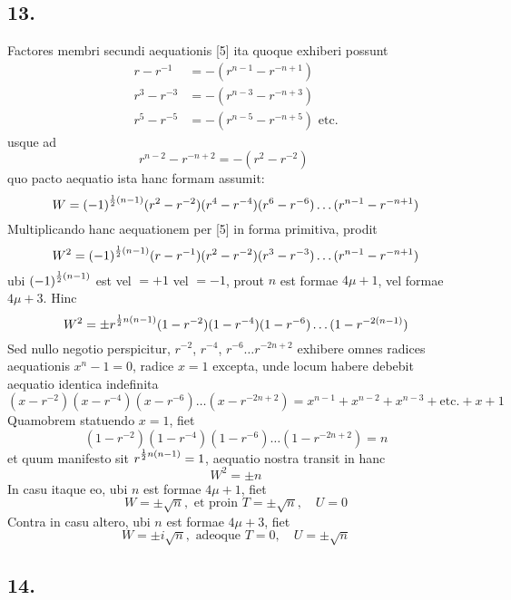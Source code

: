 \documentclass[twoside,12pt]{memoir}
\let\oldfrac\frac
\def\frac#1#2{\mathchoice{\tfrac{#1}{#2}}{\oldfrac{#1}{#2}}{\genfrac{}{}{}{2}{#1}{#2\mathstrut}}{\genfrac{}{}{}{3}{#1}{#2\mathstrut}}}
\begin{document}
\subsection*{13.}
 
Factores membri secundi aequationis [5] ita quoque exhiberi possunt
\[\begin{aligned}
r-r^{-1} & =-(r^{n-1}-r^{-n+1}) \\
r^{3}-r^{-3} & =-(r^{n-3}-r^{-n+3}) \\
r^{5}-r^{-5} & =-(r^{n-5}-r^{-n+5}) \text{ etc.}
\end{aligned}\]
usque ad
\[r^{n-2}-r^{-n+2}=-(r^{2}-r^{-2})\phantom{\text{ etc.}}\]
quo pacto aequatio ista hanc formam assumit:\pagebreak%
\[W=(-1)^{\frac{1}{2}(n-1)}(r^{2}-r^{-2})(r^{4}-r^{-4})(r^{6}-r^{-6}) \ldots (r^{n-1}-r^{-n+1})\]
Multiplicando hanc aequationem per [5] in forma primitiva, prodit
\[W^{2}=(-1)^{\frac{1}{2}(n-1)}(r-r^{-1})(r^{2}-r^{-2})(r^{3}-r^{-3}) \ldots (r^{n-1}-r^{-n+1})\]
ubi \((-1)^{\frac{1}{2}(n-1)}\) est vel \(=+1\) vel \(=-1\), prout \(n\) est formae \(4 \mu+1\), vel formae \(4 \mu+3\). Hinc
\[W^{2}= \pm r^{\frac{1}{2} n(n-1)}(1-r^{-2})(1-r^{-4})(1-r^{-6}) \ldots(1-r^{-2(n-1)})\]
Sed nullo negotio perspicitur, \(r^{-2}\), \(r^{-4}\), \(r^{-6} \ldots r^{-2 n+2}\) exhibere omnes radices aequationis \(x^{n}-1=0\), radice \(x=1\) excepta, unde locum habere debebit aequatio identica indefinita
\[(x-r^{-2})(x-r^{-4})(x-r^{-6}) \ldots(x-r^{-2 n+2})=x^{n-1}+x^{n-2}+x^{n-3}+\text{etc.}+x+1\]
Quamobrem statuendo \(x=1\), fiet
\[(1-r^{-2})(1-r^{-4})(1-r^{-6}) \ldots(1-r^{-2 n+2})=n\]
et quum manifesto sit \(r^{\frac{1}{2} n(n-1)}=1\), aequatio nostra transit in hanc
\[W^{2}= \pm n \tag{6}\]
In casu itaque eo, ubi \(n\) est formae \(4 \mu+1\), fiet
\[W= \pm \surd n, \text{ et proin } T= \pm \surd n, \quad U=0\]
Contra in casu altero, ubi \(n\) est formae \(4 \mu+3\), fiet
\[W= \pm i \surd n, \text{ adeoque } T=0, \quad U= \pm \surd n\]

\subsection*{14.}
 
\end{document}
